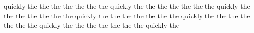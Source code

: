quickly the the the the the the the quickly the the the the the the the quickly the the the the the the the quickly the the the the the the the quickly the the the the the the the quickly the the the the the the the quickly the
